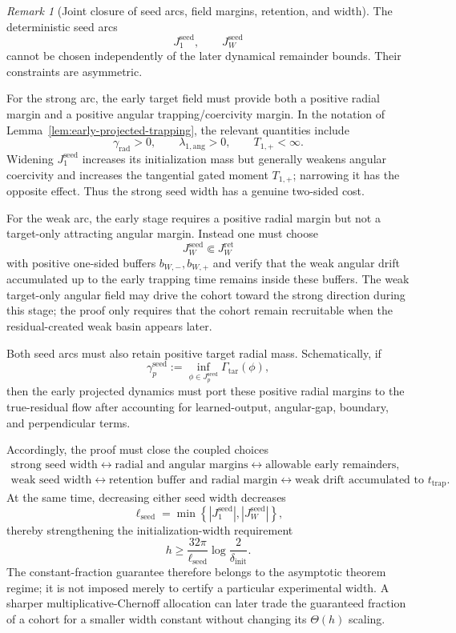\documentclass{article} %
\theoremstyle{plain}
\theoremstyle{definition}
\theoremstyle{remark}
\newtheorem{remark}[theorem]{Remark}
\begin{document}
\begin{remark}[Joint closure of seed arcs, field margins, retention, and width]
\label{rem:seed-margin-closure}
The deterministic seed arcs
\[
J_1^{\mathrm{seed}},
\qquad
J_W^{\mathrm{seed}}
\]
cannot be chosen independently of the later dynamical remainder bounds.
Their constraints are asymmetric.

For the strong arc, the early target field must provide both a positive
radial margin and a positive angular trapping/coercivity margin.  In the
notation of Lemma~\ref{lem:early-projected-trapping}, the relevant quantities
include
\[
\gamma_{\mathrm{rad}}>0,
\qquad
\lambda_{1,\mathrm{ang}}>0,
\qquad
T_{1,+}<\infty.
\]
Widening $J_1^{\mathrm{seed}}$ increases its initialization mass but generally
weakens angular coercivity and increases the tangential gated moment
$T_{1,+}$; narrowing it has the opposite effect.  Thus the strong seed width
has a genuine two-sided cost.

For the weak arc, the early stage requires a positive radial margin but not a
target-only attracting angular margin.  Instead one must choose
\[
J_W^{\mathrm{seed}}
\Subset
J_W^{\mathrm{ret}}
\]
with positive one-sided buffers $b_{W,-},b_{W,+}$ and verify that the weak
angular drift accumulated up to the early trapping time remains inside these
buffers.  The weak target-only angular field may drive the cohort toward the
strong direction during this stage; the proof only requires that the cohort
remain recruitable when the residual-created weak basin appears later.

Both seed arcs must also retain positive target radial mass.  Schematically,
if
\[
\gamma_p^{\mathrm{seed}}
:=
\inf_{\phi\in J_p^{\mathrm{seed}}}
\Gamma_{\mathrm{tar}}(\phi),
\]
then the early projected dynamics must port these positive radial margins to
the true-residual flow after accounting for learned-output, angular-gap,
boundary, and perpendicular terms.

Accordingly, the proof must close the coupled choices
\[
\boxed{
\begin{array}{c}
\text{strong seed width}
\longleftrightarrow
\text{radial and angular margins}
\longleftrightarrow
\text{allowable early remainders},
\\[2mm]
\text{weak seed width}
\longleftrightarrow
\text{retention buffer and radial margin}
\longleftrightarrow
\text{weak drift accumulated to }t_{\mathrm{trap}}.
\end{array}
}
\]
At the same time, decreasing either seed width decreases
\[
\ell_{\mathrm{seed}}
=
\min\left\{
|J_1^{\mathrm{seed}}|,
|J_W^{\mathrm{seed}}|
\right\},
\]
thereby strengthening the initialization-width requirement
\[
h
\ge
\frac{32\pi}{\ell_{\mathrm{seed}}}
\log\frac{2}{\delta_{\mathrm{init}}}.
\]
The constant-fraction guarantee therefore belongs to the asymptotic theorem
regime; it is not imposed merely to certify a particular experimental width.
A sharper multiplicative-Chernoff allocation can later trade the guaranteed
fraction of a cohort for a smaller width constant without changing its
$\Theta(h)$ scaling.
\end{remark}
\end{document}
